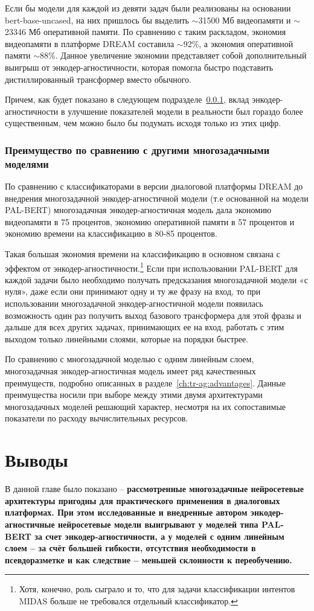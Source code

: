 Если бы модели для каждой из девяти задач были реализованы на основании bert-base-uncased, на них пришлось бы выделить $\sim$31500 Мб видеопамяти и $\sim$23346 Мб оперативной памяти. По сравнению с таким раскладом, экономия видеопамяти в платформе {DREAM} составила $\sim$92\%, а экономия оперативной памяти $\sim$88\%. Данное увеличение экономии представляет собой дополнительный выигрыш от энкодер-агностичности, которая помогла быстро подставить дистиллированный трансформер вместо обычного.

Причем, как будет показано в следующем подразделе~\ref{economy_real}, вклад энкодер-агностичности в улучшение показателей модели в реальности был гораздо более существенным, чем можно было бы подумать исходя только из этих цифр.

\subsubsection{Преимущество по сравнению с другими многозадачными моделями}
\label{economy_real} 
По сравнению с классификаторами в версии диалоговой платформы {DREAM} до внедрения многозадачной энкодер-агностичной модели (т.е основанной на модели PAL-BERT) многозадачная энкодер-агностичная модель дала экономию видеопамяти в 75 процентов, экономию оперативной памяти в 57 процентов и экономию времени на классификацию в 80-85 процентов.
 
Такая большая экономия времени на классификацию в основном связана с эффектом от энкодер-агностичности.\footnote{Хотя, конечно, роль сыграло и то, что для задачи классификации интентов MIDAS больше не требовался отдельный классификатор.} Если при использовании PAL-BERT для каждой задачи было необходимо получать предсказания многозадачной модели «с нуля», даже если они принимают одну и ту же фразу на вход, то при использовании многозадачной энкодер-агностичной модели появилась возможность один раз получить выход базового трансформера для этой фразы и дальше для всех других задачах, принимающих ее на вход, работать с этим выходом только линейными слоями, которые на порядки быстрее.

По сравнению с многозадачной моделью с одним линейным слоем, многозадачная энкодер-агностичная модель имеет ряд качественных преимуществ, подробно описанных в разделе~\ref{ch:tr-ag:advantages}. Данные преимущества носили при выборе между этими двумя архитектурами многозадачных моделей решающий характер, несмотря на их сопоставимые показатели по расходу вычислительных ресурсов.

\section{Выводы}
В данной главе было показано -- \textbf{рассмотренные многозадачные нейросетевые архитектуры пригодны для практического применения в диалоговых платформах. При этом исследованные и внедренные автором энкодер-агностичные нейросетевые модели выигрывают у моделей типа PAL-BERT за счет энкодер-агностичности, а у моделей с одним линейным слоем -- за счёт большей гибкости, отсутствия необходимости в псевдоразметке и как следствие -- меньшей склонности к переобучению.}



